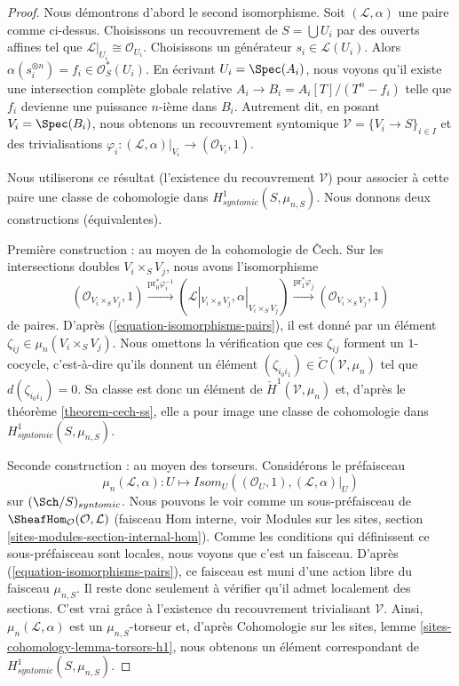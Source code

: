 \begin{proof}
Nous d\'emontrons d'abord le second isomorphisme.
Soit $(\mathcal{L}, \alpha)$ une paire comme ci-dessus.
Choisissons un recouvrement de $S = \bigcup U_i$ par des ouverts affines tel que
$\mathcal{L}|_{U_i} \cong \mathcal{O}_{U_i}$. Choisissons un g\'en\'erateur $s_i \in \mathcal{L}(U_i)$.
Alors $\alpha(s_i^{\otimes n}) = f_i \in \mathcal{O}_S^*(U_i)$.
En \'ecrivant $U_i = \Spec(A_i)$, nous voyons qu'il existe une
intersection compl\`ete globale relative $A_i \to B_i = A_i[T]/(T^n - f_i)$
telle que $f_i$ devienne une puissance $n$-i\`eme dans $B_i$. Autrement dit, en posant
$V_i = \Spec(B_i)$, nous obtenons un recouvrement syntomique
$\mathcal{V} = \{V_i \to S\}_{i \in I}$ et des trivialisations
$\varphi_i : (\mathcal{L}, \alpha)|_{V_i} \to (\mathcal{O}_{V_i}, 1)$.

\medskip\noindent
Nous utiliserons ce r\'esultat (l'existence du recouvrement $\mathcal{V}$)
pour associer \`a cette paire une classe de cohomologie dans
$H^1_{syntomic}(S, \mu_{n, S})$. Nous donnons deux constructions (\'equivalentes).

\medskip\noindent
Premi\`ere construction : au moyen de la cohomologie de {\v C}ech.
Sur les intersections doubles $V_i \times_S V_j$, nous avons l'isomorphisme
$$
(\mathcal{O}_{V_i \times_S V_j}, 1)
\xrightarrow{\text{pr}_0^*\varphi_i^{-1}}
(\mathcal{L}|_{V_i \times_S V_j}, \alpha|_{V_i \times_S V_j})
\xrightarrow{\text{pr}_1^*\varphi_j}
(\mathcal{O}_{V_i \times_S V_j}, 1)
$$
de paires. D'apr\`es (\ref{equation-isomorphisms-pairs}), il est donn\'e par un
\'el\'ement $\zeta_{ij} \in \mu_n(V_i \times_S V_j)$. Nous omettons la v\'erification
que ces $\zeta_{ij}$ forment un $1$-cocycle, c'est-\`a-dire qu'ils donnent
un \'el\'ement $(\zeta_{i_0i_1}) \in \check C(\mathcal{V}, \mu_n)$
tel que $d(\zeta_{i_0i_1}) = 0$. Sa classe est donc un \'el\'ement de
$\check H^1(\mathcal{V}, \mu_n)$ et, d'apr\`es le
th\'eor\`eme \ref{theorem-cech-ss},
elle a pour image une classe de cohomologie dans $H^1_{syntomic}(S, \mu_{n, S})$.

\medskip\noindent
Seconde construction : au moyen des torseurs. Consid\'erons le pr\'efaisceau
$$
\mu_n(\mathcal{L}, \alpha) :
U
\longmapsto
\mathit{Isom}_U((\mathcal{O}_U, 1), (\mathcal{L}, \alpha)|_U)
$$
sur $(\Sch/S)_{syntomic}$.
Nous pouvons le voir comme un sous-pr\'efaisceau de
$\SheafHom_\mathcal{O}(\mathcal{O}, \mathcal{L})$ (faisceau Hom interne,
voir
Modules sur les sites, section \ref{sites-modules-section-internal-hom}).
Comme les conditions qui d\'efinissent ce sous-pr\'efaisceau sont locales, nous voyons que c'est
un faisceau.
D'apr\`es (\ref{equation-isomorphisms-pairs}), ce faisceau est muni d'une action libre du
faisceau $\mu_{n, S}$. Il reste donc seulement \`a v\'erifier qu'il
admet localement des sections. C'est vrai gr\^ace \`a l'existence du
recouvrement trivialisant $\mathcal{V}$. Ainsi, $\mu_n(\mathcal{L}, \alpha)$
est un $\mu_{n, S}$-torseur et, d'apr\`es
Cohomologie sur les sites, lemme \ref{sites-cohomology-lemma-torsors-h1},
nous obtenons un \'el\'ement correspondant de $H^1_{syntomic}(S, \mu_{n, S})$.


\end{proof}
